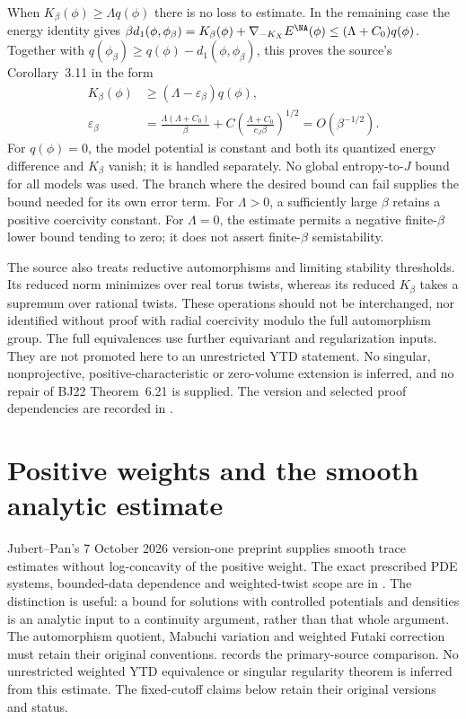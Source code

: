 When $K_\beta(\phi)\geq\Lambda q(\phi)$ there is no loss to estimate.
In the remaining case the energy identity gives
$\beta d_1(\phi,\phi_\beta)
=K_\beta(\phi)+\nabla_{-K_X}E^{\NA}(\phi)
\leq(\Lambda+C_0)q(\phi)$.
Together with $q(\phi_\beta)\geq q(\phi)-d_1(\phi,\phi_\beta)$,
this proves the source's Corollary~3.11 in the form
\[
 \begin{aligned}
 K_\beta(\phi)&\geq(\Lambda-\varepsilon_\beta)q(\phi),\\
 \varepsilon_\beta
   &=\frac{\Lambda(\Lambda+C_0)}{\beta}
       +C\left(\frac{\Lambda+C_0}{c_J\beta}\right)^{1/2}
       =O(\beta^{-1/2}).
 \end{aligned}
\tag{68.23cr}\label{eq:ytd-Khat-Kbeta-uniform-error}
\]
For $q(\phi)=0$, the model potential is constant and both its
quantized energy difference and $K_\beta$ vanish; it is handled
separately. No global entropy-to-$J$ bound for all models was used.
The branch where the desired bound can fail supplies the bound needed
for its own error term. For $\Lambda>0$, a sufficiently large
$\beta$ retains a positive coercivity constant. For $\Lambda=0$,
the estimate permits a negative finite-$\beta$ lower bound tending
to zero; it does not assert finite-$\beta$ semistability.

The source also treats reductive automorphisms and limiting stability
thresholds. Its reduced norm minimizes over real torus twists, whereas
its reduced $K_\beta$ takes a supremum over rational twists.
These operations should not be interchanged, nor identified without
proof with radial coercivity modulo the full automorphism group.
The full equivalences use further equivariant and regularization
inputs. They are not promoted here to an unrestricted YTD statement.
No singular, nonprojective, positive-characteristic or zero-volume
extension is inferred, and no repair of BJ22 Theorem~6.21 is supplied.
The version and selected proof dependencies are recorded in
.

\section{Positive weights and the smooth analytic estimate}
\label{sec:ytd-positive-weight-estimates}

Jubert--Pan's 7 October 2026 version-one preprint
\cite{JubertPan26PositiveWeightsV1} supplies smooth trace estimates
without log-concavity of the positive weight. The exact prescribed
PDE systems, bounded-data dependence and weighted-twist scope are in
. The distinction is useful:
a bound for solutions with controlled potentials and densities is an
analytic input to a continuity argument, rather than that whole argument.
The automorphism quotient, Mabuchi variation and weighted Futaki
correction must retain their original conventions.
 records the primary-source
comparison. No unrestricted weighted YTD equivalence or singular
regularity theorem is inferred from this estimate. The fixed-cutoff
claims below retain their original versions and status.

